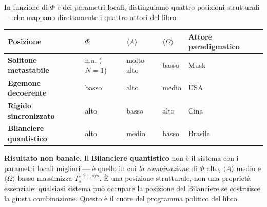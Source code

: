 In funzione di \(\Phi\) e dei parametri locali, distinguiamo quattro
posizioni strutturali --- che mappano direttamente i quattro attori del
libro:

{\def\LTcaptype{none} %
{\small\begin{longtable}[]{@{}
  >{\raggedright\arraybackslash}p{}
  >{\raggedright\arraybackslash}p{}
  >{\raggedright\arraybackslash}p{}
  >{\raggedright\arraybackslash}p{}
  >{\raggedright\arraybackslash}p{}@{}}
\toprule\noalign{}
\begin{minipage}[b]{\linewidth}\raggedright
Posizione
\end{minipage} & \begin{minipage}[b]{\linewidth}\raggedright
\(\Phi\)
\end{minipage} & \begin{minipage}[b]{\linewidth}\raggedright
\(\langle A\rangle\)
\end{minipage} & \begin{minipage}[b]{\linewidth}\raggedright
\(\langle\Omega\rangle\)
\end{minipage} & \begin{minipage}[b]{\linewidth}\raggedright
Attore paradigmatico
\end{minipage} \\
\midrule\noalign{}
\endhead
\bottomrule\noalign{}
\endlastfoot
\textbf{Solitone metastabile} & n.a. (\(N=1\)) & molto alto & basso &
Musk \\
\textbf{Egemone decoerente} & basso & alto & medio & USA \\
\textbf{Rigido sincronizzato} & alto & basso & alto & Cina \\
\textbf{Bilanciere quantistico} & alto & medio & basso & Brasile \\
\end{longtable}}
}

\Proved{} \textbf{Risultato non banale.} Il \textbf{Bilanciere
quantistico} non è il sistema con i parametri locali migliori --- è
quello in cui \emph{la combinazione} di \(\Phi\) alto,
\(\langle A\rangle\) medio e \(\langle\Omega\rangle\) basso massimizza
\(T_s^{(2),\text{sys}}\). È una posizione strutturale, non una proprietà
essenziale: qualsiasi sistema può occupare la posizione del Bilanciere
se costruisce la giusta combinazione. Questo è il cuore del programma
politico del libro.



